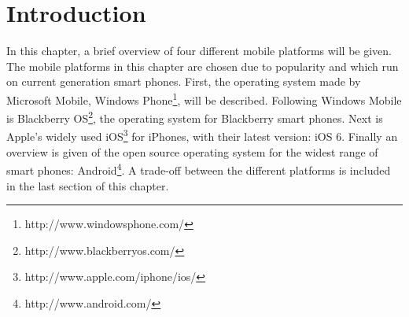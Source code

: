 \section{Introduction}
In this chapter, a brief overview of four different mobile platforms will be given. The mobile platforms in this chapter are chosen due to popularity and which run on current generation smart phones. First, the operating system made by Microsoft Mobile, Windows Phone\footnote{http://www.windowsphone.com/}, will be described. Following Windows Mobile is Blackberry OS\footnote{http://www.blackberryos.com/}, the operating system for Blackberry smart phones. Next is Apple's widely used iOS\footnote{http://www.apple.com/iphone/ios/} for iPhones, with their latest version: iOS 6. Finally an overview is given of the open source operating system for the widest range of smart phones: Android\footnote{http://www.android.com/}. A trade-off between the different platforms is included in the last section of this chapter.